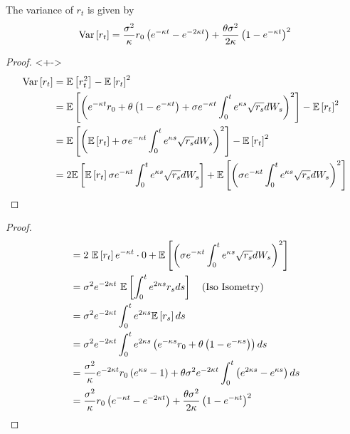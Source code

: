 \begin{frame}
	\begin{proposition}
		The variance of \( r_t \) is given by
		\[
			\text{Var} \left[ r_t \right] = \frac{\sigma^2}{\kappa} r_0
			\left( e^{-\kappa t} - e^{-2\kappa t} \right) +
			\frac{\theta\sigma^2}{2\kappa} \left( 1 - e^{-\kappa t} \right)^2
		\]
	\end{proposition}
	\begin{proof}<+->
		\begin{align*}
			\text{Var} \left[ r_t \right] &= \mathbb{E} \left[ r_t^2 \right] - \mathbb{E} \left[ r_t \right]^2 \\
			&= \mathbb{E} \left[ \left( e^{-\kappa t} r_0 + \theta
				\left( 1 - e^{-\kappa t} \right) + \sigma e^{-\kappa t}
				\int_0^t e^{\kappa s} \sqrt{r_s} dW_s \right)^2 \right] - \mathbb{E} \left[ r_t \right]^2 \\
			&= \mathbb{E} \left[ \left( \mathbb{E} \left[ r_t \right] + \sigma e^{-\kappa t}
				\int_0^t e^{\kappa s} \sqrt{r_s} dW_s \right)^2 \right]
				- \mathbb{E} \left[ r_t \right]^2 \\
			&= 2\mathbb{E} \left[ \mathbb{E} \left[ r_t \right] \sigma e^{-\kappa t}
				\int_0^t e^{\kappa s} \sqrt{r_s} dW_s \right]
				+ \mathbb{E} \left[ \left( \sigma e^{-\kappa t} \int_0^t e^{\kappa s}
				\sqrt{r_s} dW_s \right)^2 \right]
		\end{align*}
	\end{proof}
\end{frame}

\begin{frame}
	\begin{proof}
		\begin{align*}
			&= 2\ \mathbb{E} \left[ r_t \right] e^{-\kappa t} \cdot 0 +
				\mathbb{E} \left[ \left( \sigma e^{-\kappa t} \int_0^t e^{\kappa s}
				\sqrt{r_s} dW_s \right)^2 \right] \\
			&= \sigma^2 e^{-2\kappa t} \ \mathbb{E} \left[ \int_0^t e^{2\kappa s} r_s ds \right]
				\quad (\text{Iso Isometry}) \\
			&= \sigma^2 e^{-2\kappa t}
				\int_0^t e^{2\kappa s} \mathbb{E} \left[ r_s \right] ds \\
			&= \sigma^2 e^{-2\kappa t}
				\int_0^t e^{2\kappa s} \left( e^{-\kappa s} r_0 +
				\theta \left( 1 - e^{-\kappa s} \right) \right) ds \\
			&= \frac{\sigma^2}{\kappa} e^{-2\kappa t} r_0
				\left( e^{\kappa s} - 1 \right)
				+ \theta\sigma^2 e^{-2\kappa t}
				\int_0^t \left( e^{2\kappa s} - e^{\kappa s} \right) ds \\
			&= \frac{\sigma^2}{\kappa} r_0
				\left( e^{-\kappa t} - e^{-2\kappa t} \right) +
				\frac{\theta\sigma^2}{2\kappa} \left( 1 - e^{-\kappa t} \right)^2
		\end{align*}
	\end{proof}
\end{frame}

